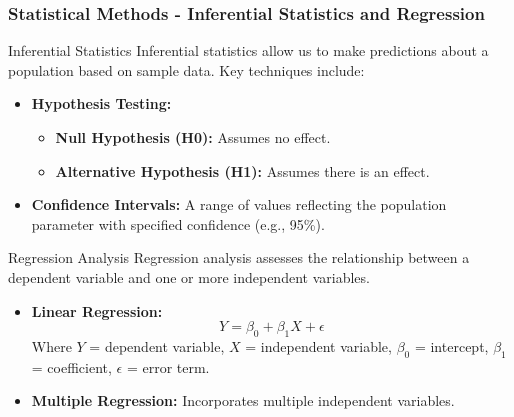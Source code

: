 \documentclass[aspectratio=169]{beamer}
\begin{document}
\begin{frame}[fragile]
    \frametitle{Statistical Methods - Inferential Statistics and Regression}
    \begin{block}{Inferential Statistics}
        Inferential statistics allow us to make predictions about a population based on sample data. Key techniques include:
        \begin{itemize}
            \item \textbf{Hypothesis Testing:} 
            \begin{itemize}
                \item \textbf{Null Hypothesis (H0):} Assumes no effect.
                \item \textbf{Alternative Hypothesis (H1):} Assumes there is an effect.
            \end{itemize}
            \item \textbf{Confidence Intervals:} A range of values reflecting the population parameter with specified confidence (e.g., 95\%).
        \end{itemize}
    \end{block}
    
    \begin{block}{Regression Analysis}
        Regression analysis assesses the relationship between a dependent variable and one or more independent variables.
        \begin{itemize}
            \item \textbf{Linear Regression:} 
            \begin{equation}
            Y = \beta_0 + \beta_1X + \epsilon
            \end{equation}
            Where \(Y\) = dependent variable, \(X\) = independent variable, \(\beta_0\) = intercept, \(\beta_1\) = coefficient, \(\epsilon\) = error term.
            \item \textbf{Multiple Regression:} Incorporates multiple independent variables.
        \end{itemize}
    \end{block}
\end{frame}
\end{document}
